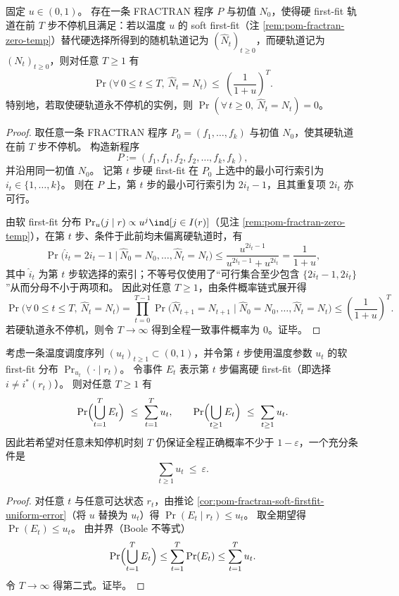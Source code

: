 \begin{theorem}\label{thm:pom-fractran-soft-firstfit-fixed-temp-exponential-collapse}
固定 \(u\in(0,1)\)。
存在一条 FRACTRAN 程序 \(P\) 与初值 \(N_0\)，使得硬 first-fit 轨道在前 \(T\) 步不停机且满足：若以温度 \(u\) 的 soft first-fit（注 \ref{rem:pom-fractran-zero-temp}）替代硬选择所得到的随机轨道记为 \((\widehat N_t)_{t\ge 0}\)，而硬轨道记为 \((N_t)_{t\ge 0}\)，则对任意 \(T\ge 1\) 有
\[
\Pr\!\bigl(\forall\,0\le t\le T,\ \widehat N_t=N_t\bigr)\ \le\ \left(\frac{1}{1+u}\right)^T.
\]
特别地，若取使硬轨道永不停机的实例，则 \(\Pr(\forall\,t\ge 0,\ \widehat N_t=N_t)=0\)。
\end{theorem}
\begin{proof}
取任意一条 FRACTRAN 程序 \(P_0=(f_1,\dots,f_k)\) 与初值 \(N_0\)，使其硬轨道在前 \(T\) 步不停机。
构造新程序
\[
P:=(f_1,f_1,f_2,f_2,\dots,f_k,f_k),
\]
并沿用同一初值 \(N_0\)。
记第 \(t\) 步硬 first-fit 在 \(P_0\) 上选中的最小可行索引为 \(i_t\in\{1,\dots,k\}\)。
则在 \(P\) 上，第 \(t\) 步的最小可行索引为 \(2i_t-1\)，且其重复项 \(2i_t\) 亦可行。

由软 first-fit 分布 \(\Pr_u(j\mid r)\propto u^{j}\ind[j\in I(r)]\)（见注 \ref{rem:pom-fractran-zero-temp}），在第 \(t\) 步、条件于此前均未偏离硬轨道时，有
\[
\Pr\!\bigl(\widehat i_t=2i_t-1\ \big|\ \widehat N_0=N_0,\dots,\widehat N_t=N_t\bigr)
\le
\frac{u^{2i_t-1}}{u^{2i_t-1}+u^{2i_t}}
=\frac{1}{1+u},
\]
其中 \(\widehat i_t\) 为第 \(t\) 步软选择的索引；不等号仅使用了“可行集合至少包含 \(\{2i_t-1,2i_t\}\)”从而分母不小于两项和。
因此对任意 \(T\ge 1\)，由条件概率链式展开得
\[
\Pr\!\bigl(\forall\,0\le t\le T,\ \widehat N_t=N_t\bigr)
=\prod_{t=0}^{T-1}\Pr\!\bigl(\widehat N_{t+1}=N_{t+1}\mid \widehat N_0=N_0,\dots,\widehat N_t=N_t\bigr)
\le\left(\frac{1}{1+u}\right)^T.
\]
若硬轨道永不停机，则令 \(T\to\infty\) 得到全程一致事件概率为 \(0\)。证毕。
\end{proof}

\begin{theorem}[温度预算的全程可靠性上界与输入无关设计准则]\label{thm:pom-fractran-soft-firstfit-annealed-budget}
考虑一条温度调度序列 \((u_t)_{t\ge 1}\subset(0,1)\)，并令第 \(t\) 步使用温度参数 \(u_t\) 的软 first-fit 分布 \(\Pr_{u_t}(\cdot\mid r_t)\)。
令事件 \(E_t\) 表示第 \(t\) 步偏离硬 first-fit（即选择 \(i\neq i^\ast(r_t)\)）。
则对任意 \(T\ge 1\) 有
\[
\Pr\Bigl(\bigcup_{t=1}^{T}E_t\Bigr)\ \le\ \sum_{t=1}^{T}u_t,
\qquad
\Pr\Bigl(\bigcup_{t\ge 1}E_t\Bigr)\ \le\ \sum_{t\ge 1}u_t.
\]
因此若希望对任意未知停机时刻 \(T\) 仍保证全程正确概率不少于 \(1-\varepsilon\)，一个充分条件是
\[
\sum_{t\ge 1}u_t\ \le\ \varepsilon.
\]
\end{theorem}
\begin{proof}
对任意 \(t\) 与任意可达状态 \(r_t\)，由推论 \ref{cor:pom-fractran-soft-firstfit-uniform-error}（将 \(u\) 替换为 \(u_t\)）得
\(\Pr(E_t\mid r_t)\le u_t\)。
取全期望得 \(\Pr(E_t)\le u_t\)。
由并界（Boole 不等式）
\[
\Pr\Bigl(\bigcup_{t=1}^{T}E_t\Bigr)\le \sum_{t=1}^{T}\Pr(E_t)\le \sum_{t=1}^{T}u_t.
\]
令 \(T\to\infty\) 得第二式。证毕。
\end{proof}

